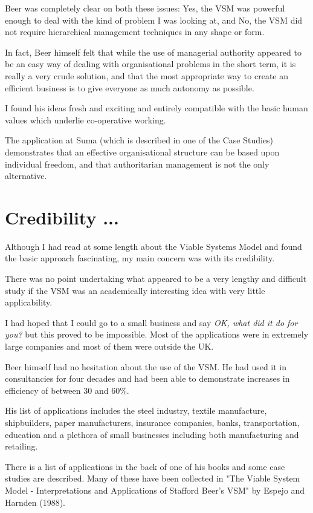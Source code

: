 Beer was completely clear on both these issues: Yes, the VSM was powerful enough to deal with the kind of problem I was looking at, and No, the VSM did not require hierarchical management techniques in any shape or form.

In fact, Beer himself felt that while the use of managerial authority appeared to be an easy way of dealing with organisational problems in the short term, it is really a very crude solution, and that the most appropriate way to create an efficient business is to give everyone as much autonomy as possible.

I found his ideas fresh and exciting and entirely compatible with the basic human values which underlie co-operative working.

The application at Suma (which is described in one of the Case Studies) demonstrates that an effective organisational structure can be based upon individual freedom, and that authoritarian management is not the only alternative.

\section*{Credibility ...}
Although I had read at some length about the Viable Systems Model and found the basic approach fascinating, my main concern was with its credibility.

There was no point undertaking what appeared to be a very lengthy and difficult study if the VSM was an academically interesting idea with very little applicability.

I had hoped that I could go to a small business and say \textit{OK, what did it do for you?} but this proved to be impossible. Most of the applications were in extremely large companies and most of them were outside the UK.

Beer himself had no hesitation about the use of the VSM. He had used it in consultancies for four decades and had been able to demonstrate increases in efficiency of between 30 and 60\%.

His list of applications includes the steel industry, textile manufacture, shipbuilders, paper manufacturers, insurance companies, banks, transportation, education and a plethora of small businesses including both manufacturing and retailing.

There is a list of applications in the back of one of his books and some case studies are described. Many of these have been collected in "The Viable System Model - Interpretations and Applications of Stafford Beer's VSM" by Espejo and Harnden (1988).

